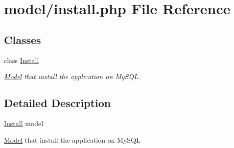 \hypertarget{install_8php}{\section{model/install.php File Reference}
\label{install_8php}
}
\subsection*{Classes}
\begin{DoxyCompactItemize}
\item 
class \hyperlink{classInstall}{Install}
\begin{DoxyCompactList}\small\item\em \hyperlink{classModel}{Model} that install the application on My\-S\-Q\-L. \end{DoxyCompactList}\end{DoxyCompactItemize}


\subsection{Detailed Description}
\hyperlink{classInstall}{Install} model

\hyperlink{classModel}{Model} that install the application on My\-S\-Q\-L 